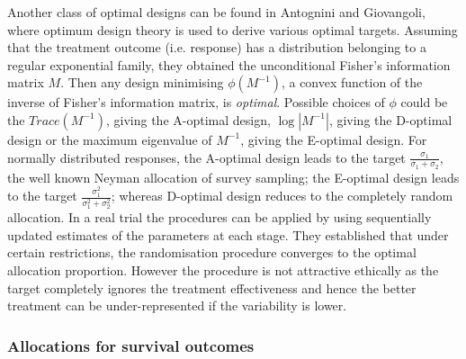 Another class of optimal designs can be found in Antognini and
Giovangoli\cite{47}, where optimum design theory\cite{48}  is
used to derive various optimal targets. Assuming that the treatment outcome (i.e. response) has a distribution belonging to a regular exponential family, they obtained the unconditional Fisher's information matrix $M$. Then any design minimising $\phi(M^{-1})$, a convex function of the inverse of Fisher's information matrix, is \textit{optimal}. Possible choices of $\phi$ could be the $Trace(M^{-1})$, giving the A-optimal design, $\log|M^{-1}|$, giving the D-optimal design or the maximum eigenvalue of $M^{-1}$, giving
the E-optimal design. For normally distributed responses, the
A-optimal design leads to the target $\frac{\sigma_{1}}{\sigma_{1}+\sigma_{2}}$, the well known Neyman
allocation of survey sampling; the E-optimal design leads to the target
$\frac{\sigma_{1}^{2}}{\sigma_{1}^{2}+\sigma_{2}^{2}}$; whereas
D-optimal design reduces to the completely random allocation. In a real trial
the procedures can be applied by using sequentially updated estimates of the parameters at each stage. They\cite{47} established that under certain restrictions, the randomisation procedure converges to the optimal allocation
proportion. However the procedure is not attractive ethically as the target completely ignores the treatment effectiveness and hence the better treatment can be under-represented if the variability is lower.

\subsubsection{Allocations for survival outcomes}

